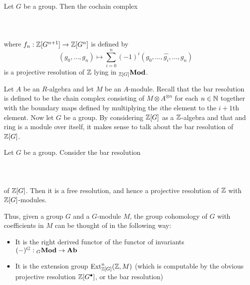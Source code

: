 \documentclass[a4paper]{article}
\begin{document}
\begin{lmm}{}{} Let $G$ be a group. Then the cochain complex \\~\\
\\~\\ where $f_n:\mathbb{Z}[G^{n+1}]\to\mathbb{Z}[G^n]$ is defined by $$(g_0,\dots,g_n)\mapsto\sum_{i=0}^n(-1)^i(g_0,\dots,\hat{g_i},\dots,g_n)$$ is a projective resolution of $\mathbb{Z}$ lying in ${_{\mathbb{Z}[G]}}\bold{Mod}$. 
\end{lmm}

Let $A$ be an $R$-algebra and let $M$ be an $A$-module. Recall that the bar resolution is defined to be the chain complex consisting of $M\otimes A^{\otimes n}$ for each $n\in\mathbb{N}$ together with the boundary maps defined by multiplying the $i$the element to the $i+1$th element. Now let $G$ be a group. By considering $\mathbb{Z}[G]$ as a $\mathbb{Z}$-algebra and that and ring is a module over itself, it makes sense to talk about the bar resolution of $\mathbb{Z}[G]$. 

\begin{thm}{}{} Let $G$ be a group. Consider the bar resolution \\~\\
\\~\\
of $\mathbb{Z}[G]$. Then it is a free resolution, and hence a projective resolution of $\mathbb{Z}$ with $\mathbb{Z}[G]$-modules. 
\end{thm}

Thus, given a group $G$ and a $G$-module $M$, the group cohomology of $G$ with coefficients in $M$ can be thought of in the following way: 
\begin{itemize}
\item It is the right derived functor of the functor of invariants $(-)^G:{_G\bold{Mod}}\to\bold{Ab}$
\item It is the extension group $\text{Ext}_{\mathbb{Z}[G]}^n(\mathbb{Z},M)$ (which is computable by the obvious projective resolution $\mathbb{Z}[G^\bullet]$, or the bar resolution)
\end{itemize}
\end{document}

